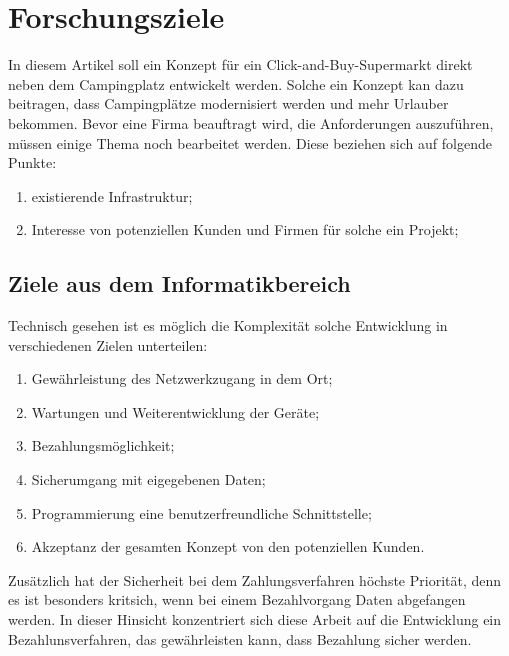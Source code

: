 \section{Forschungsziele}


In diesem Artikel soll ein Konzept für ein Click-and-Buy-Supermarkt direkt neben dem Campingplatz 
entwickelt werden. Solche ein Konzept kan dazu beitragen, dass Campingplätze modernisiert werden 
und mehr Urlauber bekommen. Bevor eine Firma beauftragt wird, die Anforderungen auszuführen, 
müssen einige Thema noch bearbeitet werden. Diese beziehen sich auf folgende Punkte: 

\begin{enumerate}
    \item existierende Infrastruktur;
    \item Interesse von potenziellen Kunden und Firmen für solche ein Projekt;
\end{enumerate}


\subsection{Ziele aus dem Informatikbereich}

Technisch gesehen ist es möglich die Komplexität solche Entwicklung in verschiedenen Zielen unterteilen:

\begin{enumerate}
    \item Gewährleistung des Netzwerkzugang in dem Ort;
    \item Wartungen und Weiterentwicklung der Geräte;
    \item Bezahlungsmöglichkeit;
    \item Sicherumgang mit eigegebenen Daten;
    \item Programmierung eine benutzerfreundliche Schnittstelle;
    \item Akzeptanz der gesamten Konzept von den potenziellen Kunden.
\end{enumerate}

Zusätzlich hat der Sicherheit bei dem Zahlungsverfahren höchste Priorität, denn es ist besonders kritsich, 
wenn bei einem Bezahlvorgang Daten abgefangen werden. In dieser Hinsicht konzentriert sich diese Arbeit
auf die Entwicklung ein Bezahlunsverfahren, das gewährleisten kann, dass Bezahlung sicher werden. 

%
%
%
%

